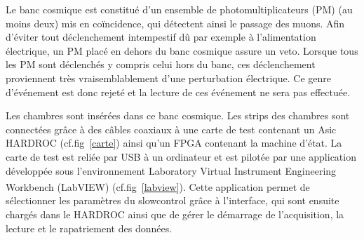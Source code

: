 Le banc cosmique est constitué d'un ensemble de photomultiplicateurs (PM) (au moins deux) mis en coïncidence, qui détectent ainsi le passage des muons. Afin d'éviter tout déclenchement intempestif dû par exemple à l'alimentation électrique, un PM placé en dehors du banc cosmique assure un veto. Lorsque tous les PM sont déclenchés y compris celui hors du banc, ces déclenchement proviennent très vraisemblablement d'une perturbation électrique. Ce genre d'événement est donc rejeté et la lecture de ces événement ne sera pas effectuée.

Les chambres sont insérées dans ce banc cosmique. Les strips des chambres sont connectées grâce à des câbles coaxiaux à une carte de test contenant un Asic HARDROC (cf.fig~\ref{carte}) ainsi qu'un FPGA contenant la machine d'état. La carte de test est reliée par USB à un ordinateur et est pilotée par une application développée sous l'environnement Laboratory Virtual Instrument Engineering Workbench (LabVIEW\textsuperscript{\textregistered}) (cf.fig~\ref{labview}). Cette application permet de sélectionner les paramètres du slowcontrol grâce à l'interface, qui sont ensuite chargés dans le HARDROC ainsi que de gérer le démarrage de l'acquisition, la lecture et le rapatriement des données. 

